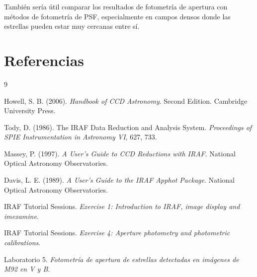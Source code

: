 \documentclass[12pt,letterpaper]{article}
\begin{document}
También sería útil comparar los resultados de fotometría de apertura con métodos de fotometría de PSF, especialmente en campos densos donde las estrellas pueden estar muy cercanas entre sí.

\section{Referencias}

\begin{thebibliography}{9}

Howell, S. B. (2006). 
\textit{Handbook of CCD Astronomy}. 
Second Edition. Cambridge University Press.

Tody, D. (1986). 
The IRAF Data Reduction and Analysis System. 
\textit{Proceedings of SPIE Instrumentation in Astronomy VI}, 627, 733.

Massey, P. (1997). 
\textit{A User's Guide to CCD Reductions with IRAF}. 
National Optical Astronomy Observatories.

Davis, L. E. (1989). 
\textit{A User's Guide to the IRAF Apphot Package}. 
National Optical Astronomy Observatories.

IRAF Tutorial Sessions. 
\textit{Exercise 1: Introduction to IRAF, image display and imexamine}.

IRAF Tutorial Sessions. 
\textit{Exercise 4: Aperture photometry and photometric calibrations}.

Laboratorio 5. 
\textit{Fotometría de apertura de estrellas detectadas en imágenes de M92 en V y B}.

\end{thebibliography}
\end{document}
